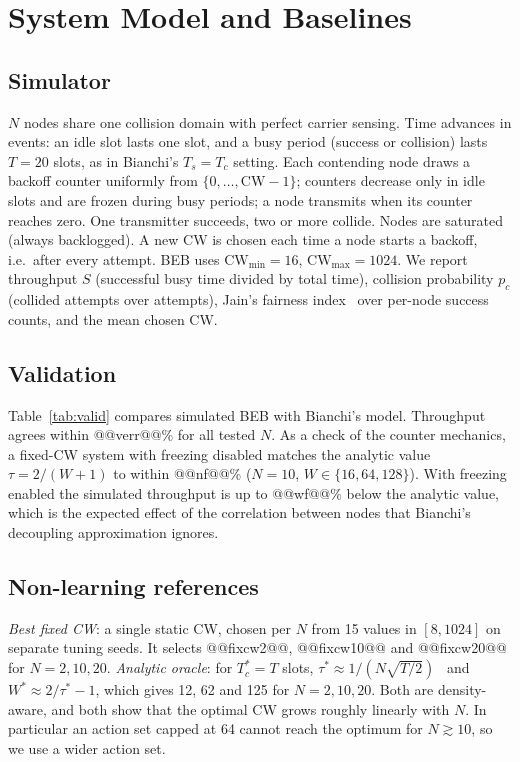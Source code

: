 \documentclass[conference]{IEEEtran}
\begin{document}
\section{System Model and Baselines}\label{sec:model}
\subsection{Simulator}
$N$ nodes share one collision domain with perfect carrier sensing. Time advances in events: an idle slot lasts one slot, and a busy period (success or collision) lasts $T{=}20$ slots, as in Bianchi's $T_s{=}T_c$ setting. Each contending node draws a backoff counter uniformly from $\{0,\dots,\mathrm{CW}-1\}$; counters decrease only in idle slots and are frozen during busy periods; a node transmits when its counter reaches zero. One transmitter succeeds, two or more collide. Nodes are saturated (always backlogged). A new CW is chosen each time a node starts a backoff, i.e.\ after every attempt. BEB uses $\mathrm{CW}_{\min}{=}16$, $\mathrm{CW}_{\max}{=}1024$. We report throughput $S$ (successful busy time divided by total time), collision probability $p_c$ (collided attempts over attempts), Jain's fairness index~\cite{jain1984} over per-node success counts, and the mean chosen CW.

\subsection{Validation}
Table~\ref{tab:valid} compares simulated BEB with Bianchi's model. Throughput agrees within @@verr@@\% for all tested $N$. As a check of the counter mechanics, a fixed-CW system with freezing disabled matches the analytic value $\tau{=}2/(W{+}1)$ to within @@nf@@\% ($N{=}10$, $W\in\{16,64,128\}$). With freezing enabled the simulated throughput is up to @@wf@@\% below the analytic value, which is the expected effect of the correlation between nodes that Bianchi's decoupling approximation ignores.
\begin{table}[t]
\caption{BEB in the simulator versus Bianchi's model (saturated, $T{=}20$, 3 seeds of $2{\times}10^5$ slots).}\label{tab:valid}
\centering\small

\end{table}

\subsection{Non-learning references}
\emph{Best fixed CW}: a single static CW, chosen per $N$ from 15 values in $[8,1024]$ on separate tuning seeds. It selects @@fixcw2@@, @@fixcw10@@ and @@fixcw20@@ for $N{=}2,10,20$. \emph{Analytic oracle}: for $T_c^*{=}T$ slots, $\tau^*\approx 1/(N\sqrt{T/2})$~\cite{bianchi2000} and $W^*\approx 2/\tau^*-1$, which gives 12, 62 and 125 for $N{=}2,10,20$. Both are density-aware, and both show that the optimal CW grows roughly linearly with $N$. In particular an action set capped at 64 cannot reach the optimum for $N\gtrsim 10$, so we use a wider action set.
\end{document}
